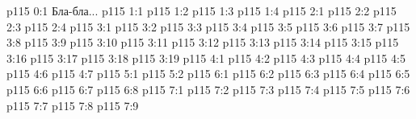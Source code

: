\author{Могущественный Посланник}
\vs p115 0:1  Бла-бла...
\vs p115 1:1 
\vs p115 1:2 
\vs p115 1:3 
\vs p115 1:4 
\vs p115 2:1 
\vs p115 2:2 
\vs p115 2:3 
\vs p115 2:4 
\vs p115 3:1 
\vs p115 3:2 
\vs p115 3:3 
\vs p115 3:4 
\vs p115 3:5 \pc 
\vs p115 3:6 
\vs p115 3:7 
\vs p115 3:8 
\vs p115 3:9 \pc 
\vs p115 3:10 
\vs p115 3:11 
\vs p115 3:12 
\vs p115 3:13 
\vs p115 3:14 
\vs p115 3:15 
\vs p115 3:16 \pc 
\vs p115 3:17 
\vs p115 3:18 
\vs p115 3:19 
\vs p115 4:1 
\vs p115 4:2 
\vs p115 4:3 
\vs p115 4:4 
\vs p115 4:5 
\vs p115 4:6 
\vs p115 4:7 
\vs p115 5:1 
\vs p115 5:2 
\vs p115 6:1 
\vs p115 6:2 
\vs p115 6:3 
\vs p115 6:4 \pc 
\vs p115 6:5 
\vs p115 6:6 
\vs p115 6:7 
\vs p115 6:8 
\vs p115 7:1 
\vs p115 7:2 
\vs p115 7:3 \pc 
\vs p115 7:4 
\vs p115 7:5 \pc 
\vs p115 7:6 
\vs p115 7:7 
\vs p115 7:8 
\vsetoff
\vs p115 7:9 
\quizlink
